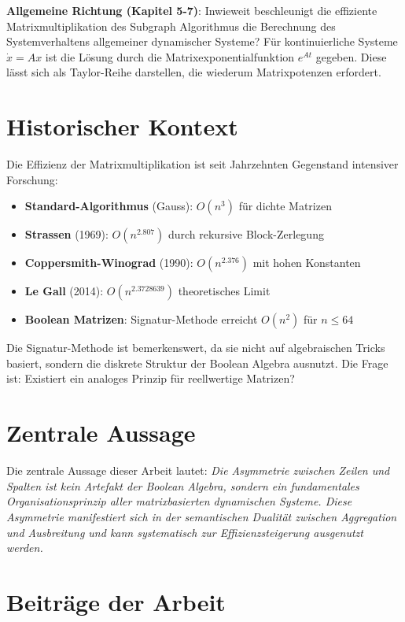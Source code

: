 \documentclass[a4paper,12pt]{report}
\theoremstyle{definition}
\begin{document}
	\textbf{Allgemeine Richtung (Kapitel 5-7)}: Inwieweit beschleunigt die effiziente Matrixmultiplikation des Subgraph Algorithmus die Berechnung des Systemverhaltens allgemeiner dynamischer Systeme? Für kontinuierliche Systeme $\dot{x} = Ax$ ist die Lösung durch die Matrixexponentialfunktion $e^{At}$ gegeben. Diese lässt sich als Taylor-Reihe darstellen, die wiederum Matrixpotenzen erfordert.
	
	\section{Historischer Kontext}
	
	Die Effizienz der Matrixmultiplikation ist seit Jahrzehnten Gegenstand intensiver Forschung:
	
	\begin{itemize}
		\item \textbf{Standard-Algorithmus} (Gauss): $O(n^3)$ für dichte Matrizen
		\item \textbf{Strassen} (1969): $O(n^{2.807})$ durch rekursive Block-Zerlegung
		\item \textbf{Coppersmith-Winograd} (1990): $O(n^{2.376})$ mit hohen Konstanten
		\item \textbf{Le Gall} (2014): $O(n^{2.3728639})$ theoretisches Limit
		\item \textbf{Boolean Matrizen}: Signatur-Methode erreicht $O(n^2)$ für $n \leq 64$
	\end{itemize}
	
	Die Signatur-Methode ist bemerkenswert, da sie nicht auf algebraischen Tricks basiert, sondern die diskrete Struktur der Boolean Algebra ausnutzt. Die Frage ist: Existiert ein analoges Prinzip für reellwertige Matrizen?
	
	\section{Zentrale Aussage}
	
	Die zentrale Aussage dieser Arbeit lautet: \textit{Die Asymmetrie zwischen Zeilen und Spalten ist kein Artefakt der Boolean Algebra, sondern ein fundamentales Organisationsprinzip aller matrixbasierten dynamischen Systeme. Diese Asymmetrie manifestiert sich in der semantischen Dualität zwischen Aggregation und Ausbreitung und kann systematisch zur Effizienzsteigerung ausgenutzt werden.}
	
	\section{Beiträge der Arbeit}
	
\end{document}
